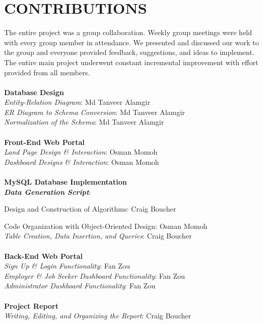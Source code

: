 \documentclass[11pt]{article}
\begin{document}
\newpage 

\section{CONTRIBUTIONS}

The entire project was a group collaboration. Weekly group meetings were held with every group member in attendance. We presented and discussed our work to the group and everyone provided feedback, suggestions, and ideas to implement. The entire main project underwent constant incremental improvement with effort provided from all members. \\
\\
\textbf{Database Design} \\
\textit{Entity-Relation Diagram}: Md Tanveer Alamgir \\
\textit{ER Diagram to Schema Conversion}: Md Tanveer Alamgir \\
\textit{Normalization of the Schema}: Md Tanveer Alamgir \\
\\
\textbf{Front-End Web Portal} \\
\textit{Land Page Design \& Interaction}: Osman Momoh \\
\textit{Dashboard Designs \& Interaction}: Osman Momoh \\
\\
\textbf{MySQL Database Implementation}\\
\textbf{\textit{Data Generation Script}}: \par
Design and Construction of Algorithms: Craig Boucher \par
Code Organization with Object-Oriented Design: Osman Momoh \\
\textit{Table Creation, Data Insertion, and Queries}: Craig Boucher \\
\\
\textbf{Back-End Web Portal} \\
\textit{Sign Up \& Login Functionality}: Fan Zou \\
\textit{Employer \& Job Seeker Dashboard Functionality}: Fan Zou \\
\textit{Administrator Dashboard Functionality}: Fan Zou \\
\\
\textbf{Project Report} \\
\textit{Writing, Editing, and Organizing the Report}: Craig Boucher
\end{document}
